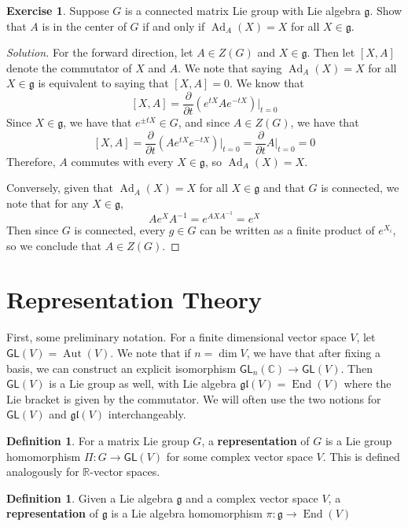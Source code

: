\documentclass[psamsfonts]{amsart}
\theoremstyle{definition}
\newtheorem{defn}[thm]{Definition}
\newtheorem{exer}[thm]{Exercise}
\theoremstyle{remark}
\newcommand{\R}{\mathbb{R}}
\newcommand{\C}{\mathbb{C}}
\newcommand{\GL}{\mathsf{GL}}
\newcommand{\gl}{\mathfrak{gl}}
\newcommand{\g}{\mathfrak{g}}
\newcommand{\inv}{^{-1}}
\newcommand{\bra}[2]{ \left[ #1, #2 \right] }
\newcommand{\bd}{\partial}
\DeclareMathOperator{\Aut}{Aut}
\DeclareMathOperator{\End}{End}
\DeclareMathOperator{\Ad}{Ad}
\begin{document}
\setcounter{thm}{16}

\begin{exer}
Suppose $G$ is a connected matrix Lie group with Lie algebra $\g$. Show that $A$ is in the center of $G$ if and only if $\Ad_A(X) = X$ for all $X \in \g$.                                                                                                                         
\end{exer}

\begin{proof}[Solution]
For the forward direction, let $A \in Z(G)$ and $X \in \g$. Then let $\bra{X}{A}$ denote the commutator of $X$ and $A$. We note that saying $\Ad_A(X) = X$ for all $X \in \g$ is equivalent to saying that $\bra{X}{A} = 0$. We know that 
$$\bra{X}{A} = \frac{\bd}{\bd t}\left(e^{tX}Ae^{-tX} \right) \bigg\vert_{t = 0}$$
Since $X \in \g$, we have that $e^{\pm tX} \in G$, and since $A \in Z(G)$, we have that 
$$\bra{X}{A} = \frac{\bd}{\bd t}\left( Ae^{tX}e^{-tX} \right) \bigg\vert_{t = 0}= \frac{\bd}{\bd t} A\bigg\vert_{t = 0} = 0 $$
Therefore, $A$ commutes with every $X \in \g$, so $\Ad_A(X) = X$.

Conversely, given that $\Ad_A(X) = X$ for all $X \in \g$ and that $G$ is connected, we note that for any $X \in \g$, 
$$Ae^XA\inv = e^{AXA\inv} = e^X $$
Then since $G$ is connected, every $g \in G$ can be written as a finite product of  $e^{X_i}$, so we conclude that $A \in Z(G)$. 
\end{proof}

\section{Representation Theory}

First, some preliminary notation. For a finite dimensional vector space $V$, let $\GL(V) = \Aut(V)$. We note that if $n = \dim V$, we have that after fixing a basis, we can construct an explicit isomorphism $\GL_n(\C) \to \GL(V)$. Then $\GL(V)$ is a Lie group as well, with Lie algebra $\gl(V) = \End(V)$ where the Lie bracket is given by the commutator. We will often use the two notions for $\GL(V)$ and $\gl(V)$ interchangeably. 
\begin{defn}
For a matrix Lie group $G$, a \textbf{representation} of $G$ is a Lie group homomorphism $\Pi: G\to\GL(V)$ for some complex vector space $V$. This is defined analogously for $\R$-vector spaces.
\end{defn}

\begin{defn}
Given a Lie algebra $\g$ and a complex vector space $V$, a \textbf{representation} of $\g$ is a Lie algebra homomorphism $\pi: \g \to \End(V)$
\end{defn}
\end{document}

